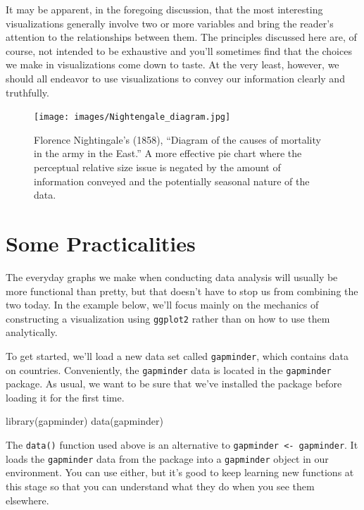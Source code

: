 \documentclass[
  letterpaper,
]{book}
\newenvironment{Shaded}{\begin{snugshade}}{\end{snugshade}}
\newcommand{\FunctionTok}[1]{\textcolor[rgb]{0.28,0.35,0.67}{#1}}
\newcommand{\NormalTok}[1]{\textcolor[rgb]{0.00,0.23,0.31}{#1}}
\begin{document}
It may be apparent, in the foregoing discussion, that the most
interesting visualizations generally involve two or more variables and
bring the reader's attention to the relationships between them. The
principles discussed here are, of course, not intended to be exhaustive
and you'll sometimes find that the choices we make in visualizations
come down to taste. At the very least, however, we should all endeavor
to use visualizations to convey our information clearly and truthfully.

\begin{figure}

{\centering \texttt{[image: images/Nightengale\_diagram.jpg]}

}

\caption{Florence Nightingale's (1858), ``Diagram of the causes of
mortality in the army in the East.'' A more effective pie chart where
the perceptual relative size issue is negated by the amount of
information conveyed and the potentially seasonal nature of the data.}

\end{figure}

\hypertarget{some-practicalities}{%
\section{Some Practicalities}\label{some-practicalities}}

The everyday graphs we make when conducting data analysis will usually
be more functional than pretty, but that doesn't have to stop us from
combining the two today. In the example below, we'll focus mainly on the
mechanics of constructing a visualization using \texttt{ggplot2} rather
than on how to use them analytically.

To get started, we'll load a new data set called \texttt{gapminder},
which contains data on countries. Conveniently, the \texttt{gapminder}
data is located in the \texttt{gapminder} package. As usual, we want to
be sure that we've installed the package before loading it for the first
time.

\begin{Shaded}
\begin{Highlighting}[]
\FunctionTok{library}\NormalTok{(gapminder)}
\FunctionTok{data}\NormalTok{(gapminder)}
\end{Highlighting}
\end{Shaded}

The \texttt{data()} function used above is an alternative to
\texttt{gapminder\ \textless{}-\ gapminder}. It loads the
\texttt{gapminder} data from the package into a \texttt{gapminder}
object in our environment. You can use either, but it's good to keep
learning new functions at this stage so that you can understand what
they do when you see them elsewhere.
\end{document}
